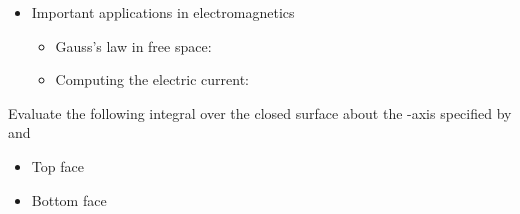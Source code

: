 \begin{ELjoin}

\begin{itemize}
\tightlist
\item
  Important applications in electromagnetics

  \begin{itemize}
  \item
    Gauss's law in free space:
  \item
    Computing the electric current:
  \end{itemize}
\end{itemize}


\begin{ELexample}{}

Evaluate the following integral over the closed surface about the -axis specified by  and 



\begin{ELsolution}


\begin{itemize}
\tightlist
\item
  Top face
\end{itemize}


\begin{itemize}
\tightlist
\item
  Bottom face
\end{itemize}


\end{ELsolution}
\end{ELexample}
\end{ELjoin}
